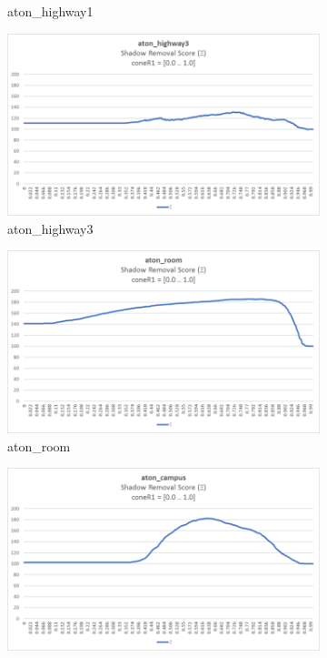 \begin{figure}
\begin{subfigure}{.45\linewidth}
  \caption{aton\_highway1}
\end{subfigure}
\hfill
\begin{subfigure}{.45\linewidth}
  \includegraphics[width=1\linewidth]{figures/highway3_coneR1_score.jpg}
  \caption{aton\_highway3}
\end{subfigure}
\hfill
\begin{subfigure}{.45\linewidth}
  \includegraphics[width=1\linewidth]{figures/room_coneR1_score.jpg}
  \caption{aton\_room}
\end{subfigure}
\hfill
\begin{subfigure}{.45\linewidth}
  \includegraphics[width=1\linewidth]{figures/campus_coneR1_score.jpg}

\end{subfigure}
\end{figure}
